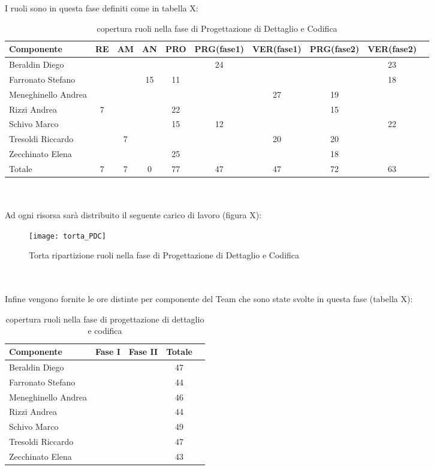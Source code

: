 I ruoli sono in questa fase definiti come in tabella X:\\
\begin{table}[h]
\centering
\begin{tabular}{|l|c|c|c|c|c|c|c|cl|}
\hline
Componente& RE& AM& AN& PRO& PRG(fase1)&VER(fase1)& PRG(fase2)& VER(fase2)& \\
\hline
Beraldin Diego & & & & & 24& & & 23&\\
Farronato Stefano & & & 15& 11& & & & 18&\\
Meneghinello Andrea & & & & & & 27& 19& &\\
Rizzi Andrea & 7& & & 22& & & 15& &\\
Schivo Marco & & & & 15& 12& & & 22&\\
Tresoldi Riccardo & & 7& & & & 20& 20& &\\
Zecchinato Elena & & & & 25& & & 18& &\\
\hline
Totale & 7& 7& 0& 77& 47& 47& 72& 63&\\
\hline
\end{tabular}
\caption{copertura ruoli nella fase di Progettazione di Dettaglio e Codifica}
\end{table}
\\\\
Ad ogni risorsa sarà distribuito il seguente carico di lavoro (figura X):\\
\begin{figure}[h]
  \texttt{[image: torta\_PDC]}
\caption{Torta ripartizione ruoli nella fase di Progettazione di Dettaglio e Codifica}
\end{figure}
\\\\
Infine vengono fornite le ore distinte per componente del Team che sono state svolte in questa fase (tabella X):\\
\begin{table}[h]
\centering
\begin{tabular}{|l|c|c|cl|}
\hline
Componente& Fase I& Fase II& Totale& \\
\hline
Beraldin Diego & & & 47&\\
Farronato Stefano & & & 44&\\
Meneghinello Andrea & & & 46&\\
Rizzi Andrea & & & 44&\\
Schivo Marco & & & 49&\\
Tresoldi Riccardo & & & 47&\\
Zecchinato Elena & & & 43&\\
\hline
\end{tabular}
\caption{copertura ruoli nella fase di progettazione di dettaglio e codifica}
\end{table}

